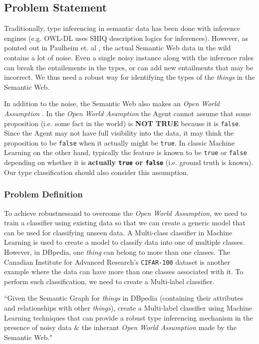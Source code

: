 \documentclass[runningheads,a4paper]{llncs}
\begin{document}
\subsection{Problem Statement}
\label{problemStatement}
Traditionally, type inferencing in semantic data has been done with inference engines (e.g. OWL-DL uses SHIQ description logics \cite{horrocks2003shiq} for inferences). However, as pointed out in Paulheim et. al \cite{paulheim2013type}, the actual Semantic Web data in the wild contains a lot of noise. Even a single noisy instance along with the inference rules can break the entailements in the types, or can add new entailments that may be incorrect. We thus need a robust way for identifying the types of the \textit{things} in the Semantic Web.  

In addition to the noise, the Semantic Web also makes an \textit{Open World Assumption} \cite{drummond2006open}. In the \textit{Open World Asumption} the Agent cannot assume that some proposition (i.e. some fact in the world) is \textbf{NOT TRUE} because it is \texttt{false}. Since the Agent may not have full visibility into the data, it may think the proposition to be \texttt{false} when it actually might be \texttt{true}. In classic Machine Learning on the other hand, typically the feature is known to be \texttt{true} or \texttt{false} depending on whether it is \textbf{actually \texttt{true} or \texttt{false}} (i.e. ground truth is known). Our type classification should also consider this assumption.

\subsubsection{Problem Definition}
To achieve robustnessand to overcome the \textit{Open World Assumption}, we need to train a classifier using existing data so that we can create a generic model that can be used for classifying unseen data. A Multi-class classifier in Machine Learning is used to create a model to classify data into one of multiple classes. However, in DBpedia, one \textit{thing} can belong to more than one classes. The Canadian Institute for Advanced Research's \texttt{CIFAR-100} dataset is another example where the data can have more than one classes associated with it\cite{krizhevsky2009learning}. To perform such classification, we need to create a Multi-label classifier\cite{tsoumakas2006multi}. 

``Given the Semantic Graph for \textit{things} in DBpedia (containing their attributes and relationships with other \textit{things}), create a Multi-label classifier using Machine Learning techniques that can 
provide a robust type inferencing mechanism in the presence of noisy data \& the inherant \textit{Open World Assumption} made by the Semantic Web."
\end{document}
